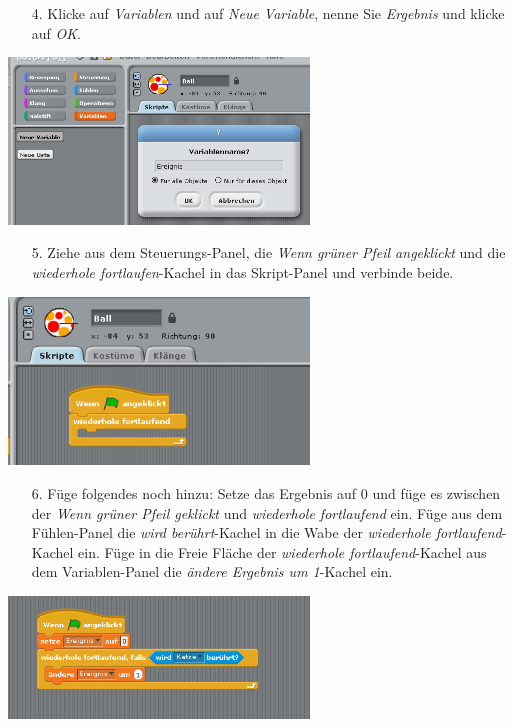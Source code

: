 \begin{itemize}
\item[4.] Klicke auf \textit{Variablen} und auf \textit{Neue Variable}, nenne Sie \textit{Ergebnis} und klicke auf \textit{OK}.
\end{itemize}
\includegraphics[width=0.6\textwidth]{images/aufgabe3_variable.png}
\begin{itemize}
\item[5.] Ziehe aus dem Steuerungs-Panel, die \textit{Wenn grüner Pfeil angeklickt} und die \textit{wiederhole fortlaufen}-Kachel in das Skript-Panel und verbinde beide.
\end{itemize}
\includegraphics[width=0.6\textwidth]{images/aufgabe3_ball1.png}
\begin{itemize}
\item[6.] Füge folgendes noch hinzu:
\subitem Setze das Ergebnis auf 0 und füge es zwischen der \textit{Wenn grüner Pfeil geklickt} und \textit{wiederhole fortlaufend} ein.
\subitem Füge aus dem Fühlen-Panel die \textit{wird berührt}-Kachel in die Wabe der \textit{wiederhole fortlaufend}-Kachel ein.
\subitem Füge in die Freie Fläche der \textit{wiederhole fortlaufend}-Kachel aus dem Variablen-Panel die \textit{ändere Ergebnis um 1}-Kachel ein.
\end{itemize}
\includegraphics[width=0.6\textwidth]{images/aufgabe3_ball2.png}

